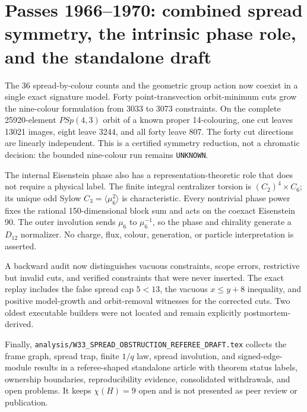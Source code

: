 \section*{Passes 1966--1970: combined spread symmetry, the intrinsic phase role, and the standalone draft}
The 36 spread-by-colour counts and the geometric group action now coexist in a
single exact signature model.  Forty point-transvection orbit-minimum cuts grow
the nine-colour formulation from 3033 to 3073 constraints.  On the complete
25920-element $PSp(4,3)$ orbit of a known proper 14-colouring, one cut leaves
13021 images, eight leave 3244, and all forty leave 807.  The forty cut
directions are linearly independent.  This is a certified symmetry reduction,
not a chromatic decision: the bounded nine-colour run remains
\texttt{UNKNOWN}.

The internal Eisenstein phase also has a representation-theoretic role that does
not require a physical label.  The finite integral centralizer torsion is
$(C_2)^4\times C_6$; its unique odd Sylow $C_3=\langle\mu_6^2\rangle$ is
characteristic.  Every nontrivial phase power fixes the rational
150-dimensional block sum and acts on the coexact Eisenstein 90.  The outer
involution sends $\mu_6$ to $\mu_6^{-1}$, so the phase and chirality generate a
$D_{12}$ normalizer.  No charge, flux, colour, generation, or particle
interpretation is asserted.

A backward audit now distinguishes vacuous constraints, scope errors,
restrictive but invalid cuts, and verified constraints that were never inserted.
The exact replay includes the false spread cap $5<13$, the vacuous
$x\le y+8$ inequality, and positive model-growth and orbit-removal witnesses for
the corrected cuts.  Two oldest executable builders were not located and remain
explicitly postmortem-derived.

Finally, \texttt{analysis/W33\_SPREAD\_OBSTRUCTION\_REFEREE\_DRAFT.tex}
collects the frame graph, spread trap, finite $1/q$ law, spread involution, and
signed-edge-module results in a referee-shaped standalone article with theorem
status labels, ownership boundaries, reproducibility evidence, consolidated
withdrawals, and open problems.  It keeps $\chi(H)=9$ open and is not presented
as peer review or publication.
